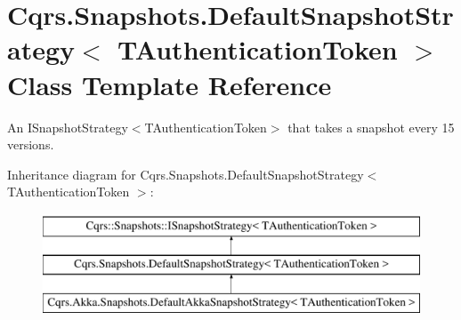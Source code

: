 \hypertarget{classCqrs_1_1Snapshots_1_1DefaultSnapshotStrategy}{}\section{Cqrs.\+Snapshots.\+Default\+Snapshot\+Strategy$<$ T\+Authentication\+Token $>$ Class Template Reference}
\label{classCqrs_1_1Snapshots_1_1DefaultSnapshotStrategy}


An I\+Snapshot\+Strategy$<$\+T\+Authentication\+Token$>$ that takes a snapshot every 15 versions.  


Inheritance diagram for Cqrs.\+Snapshots.\+Default\+Snapshot\+Strategy$<$ T\+Authentication\+Token $>$\+:\begin{figure}[H]
\begin{center}
\leavevmode
\includegraphics[height=3.000000cm]{classCqrs_1_1Snapshots_1_1DefaultSnapshotStrategy}
\end{center}
\end{figure}
